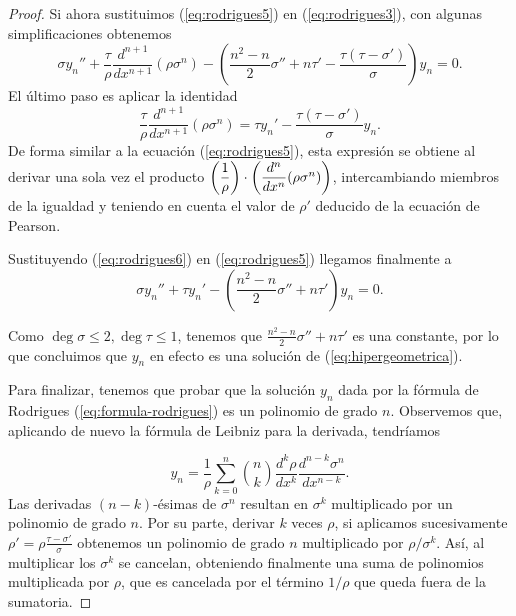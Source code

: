 \begin{proof}
    Si ahora sustituimos (\ref{eq:rodrigues5}) en (\ref{eq:rodrigues3}), con algunas simplificaciones obtenemos
    \begin{equation}
        \sigma y_n'' + \frac{\tau}{\rho} \frac{d^{n+1}}{d x^{n+1}} \left(\rho\sigma^n \right) - \left(\frac{n^2-n}{2}\sigma''+n\tau'-\frac{\tau(\tau-\sigma')}{\sigma}  \right)y_n = 0.
    \end{equation}
    El último paso es aplicar la identidad 
    \begin{equation}
        \label{eq:rodrigues6}
        \frac{\tau}{\rho}\frac{d^{n+1}}{d x^{n+1}} \left(\rho\sigma^n \right) = \tau y_n'-\frac{\tau(\tau-\sigma')}{\sigma}y_n.
    \end{equation}
    De forma similar a la ecuación (\ref{eq:rodrigues5}), esta expresión se obtiene al derivar una sola vez el producto $\left(\dfrac 1 {\rho}\right)\cdot\nolinebreak\left(\dfrac{d^n}{dx^n} (\rho\sigma^n)\right)$, intercambiando miembros de la igualdad y teniendo en cuenta el valor de $\rho'$ deducido de la ecuación de Pearson. 

    Sustituyendo (\ref{eq:rodrigues6}) en (\ref{eq:rodrigues5}) llegamos finalmente a 
    \begin{equation}
        \sigma y_n'' + \tau y_n' - \left(\frac{n^2-n}{2}\sigma'' + n\tau' \right)y_n =0.
    \end{equation}
    
    Como $\deg\sigma\leq 2,  \deg\tau\leq 1$, tenemos que $\frac{n^2-n}{2}\sigma'' + n\tau'$ es una constante, por lo que concluimos que $y_n$ en efecto es una solución de (\ref{eq:hipergeometrica}).
    
    Para finalizar, tenemos que probar que la solución $y_n$ dada por la fórmula de Rodrigues (\ref{eq:formula-rodrigues}) es un polinomio de grado $n$. Observemos que, aplicando de nuevo la fórmula de Leibniz para la derivada, tendríamos
    
    $$
    y_n = \frac 1 \rho \sum_{k=0}^n \binom{n}{k} \frac{d^k \rho}{d x^k} \frac{d^{n-k} \sigma^n}{d x^{n-k}}.
    $$
    Las derivadas $(n-k)$-ésimas de $\sigma^n$ resultan en $\sigma^k$ multiplicado por un polinomio de grado $n$. Por su parte, derivar $k$ veces $\rho$, si aplicamos sucesivamente $\rho' = \rho\frac{\tau-\sigma'}{\sigma}$ obtenemos un polinomio de grado $n$ multiplicado por $\rho/\sigma^k$. Así, al multiplicar los $\sigma^k$ se cancelan, obteniendo finalmente una suma de polinomios multiplicada por $\rho$, que es cancelada por el término $1/\rho$ que queda fuera de la sumatoria. 


\end{proof}

